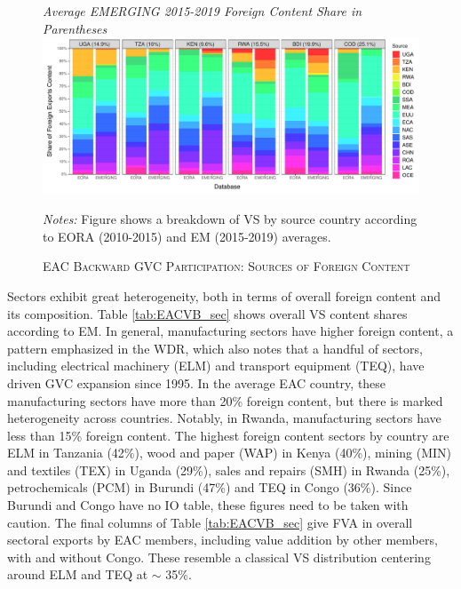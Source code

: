 \documentclass[a4paper]{article}
\begin{document}
\begin{figure}[h!]
\centering
\caption{\label{fig:EACVB_ctry}\textsc{EAC Backward GVC Participation: Sources of Foreign Content}}
\small{\textit{Average EMERGING 2015-2019 Foreign Content Share in Parentheses}}
\vspace{2mm}
\includegraphics[width=1\textwidth, trim= {0 2mm 0 0}, clip]{"VA_shares_ctry.pdf"} \\ \raggedright
\scriptsize
\vspace{-2mm}
\emph{Notes:} Figure shows a breakdown of VS by source country according to EORA (2010-2015) and EM (2015-2019) averages. 
\end{figure}
\FloatBarrier

Sectors exhibit great heterogeneity, both in terms of overall foreign content and its composition. Table \ref{tab:EACVB_sec} shows overall VS content shares according to EM. In general, manufacturing sectors have higher foreign content, a pattern emphasized in the WDR, which also notes that a handful of sectors, including electrical machinery (ELM) and transport equipment (TEQ), have driven GVC expansion since 1995. In the average EAC country, these manufacturing sectors have more than 20\% foreign content, but there is marked heterogeneity across countries. Notably, in Rwanda, manufacturing sectors have less than 15\% foreign content. The highest foreign content sectors by country are ELM in Tanzania (42\%), wood and paper (WAP) in Kenya (40\%), mining (MIN) and textiles (TEX) in Uganda (29\%), sales and repairs (SMH) in Rwanda (25\%), petrochemicals (PCM) in Burundi (47\%) and TEQ in Congo (36\%). Since Burundi and Congo have no IO table, these figures need to be taken with caution. The final columns of Table \ref{tab:EACVB_sec} give FVA in overall sectoral exports by EAC members, including value addition by other members, with and without Congo. These resemble a classical VS distribution centering around ELM and TEQ at $\sim$ 35\%. \newline
\end{document}
